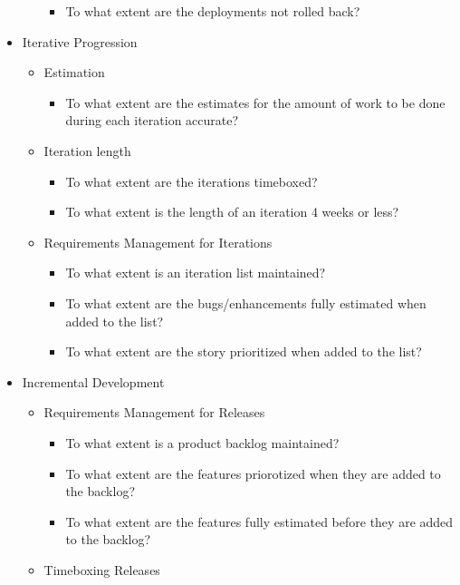 \begin{appendices}
\begin{itemize}
\begin{itemize}
\begin{itemize}
					\item To what extent are the deployments not rolled back?
				\end{itemize}
		\end{itemize}
	\item Iterative Progression
		\begin{itemize}
			\item Estimation
				\begin{itemize}
					\item To what extent are the estimates for the amount of work to be done during each iteration accurate?
				\end{itemize}
			\item Iteration length
				\begin{itemize}
					\item To what extent are the iterations timeboxed?
					\item To what extent is the length of an iteration 4 weeks or less?
				\end{itemize}
			\item Requirements Management for Iterations
				\begin{itemize}
					\item To what extent is an iteration list maintained?
					\item To what extent are the bugs/enhancements fully estimated when added to the list?
					\item To what extent are the story prioritized when added to the list?
				\end{itemize}
		\end{itemize}
	\item Incremental Development
		\begin{itemize}
			\item Requirements Management for Releases
				\begin{itemize}
					\item To what extent is a product backlog maintained?
					\item To what extent are the features priorotized when they are added to the backlog?
					\item To what extent are the features fully estimated before they are added to the backlog?
				\end{itemize}
			\item Timeboxing Releases

\end{itemize}
\end{itemize}
\end{appendices}
